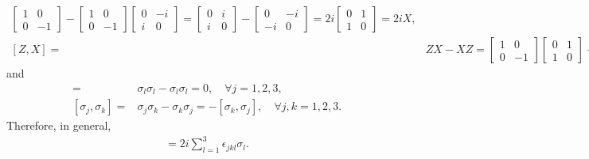 \documentclass[en]{sol-man}
\begin{document}
\begin{pf}
\begin{align}
\begin{bmatrix}
            1&0\\
            0&-1
        \end{bmatrix}-\begin{bmatrix}
            1&0\\
            0&-1
        \end{bmatrix}\begin{bmatrix}
            0&-i\\
            i&0
        \end{bmatrix}=\begin{bmatrix}
            0&i\\
            i&0
        \end{bmatrix}-\begin{bmatrix}
            0&-i\\
            -i&0
        \end{bmatrix}=2i\begin{bmatrix}
            0&1\\
            1&0
        \end{bmatrix}=2iX,\\
        [Z,X]=&ZX-XZ=\begin{bmatrix}
            1&0\\
            0&-1
        \end{bmatrix}\begin{bmatrix}
            0&1\\
            1&0
        \end{bmatrix}-\begin{bmatrix}
            0&1\\
            1&0
        \end{bmatrix}\begin{bmatrix}
            1&0\\
            0&-1
        \end{bmatrix}=\begin{bmatrix}
            0&1\\
            -1&0
        \end{bmatrix}-\begin{bmatrix}
            0&-1\\
            1&0
        \end{bmatrix}=2i\begin{bmatrix}
            0&-i\\
            i&0
        \end{bmatrix}=2iY,
    \end{align}
    and
    \begin{align}
        [\sigma_j,\sigma_j]=&\sigma_l\sigma_l-\sigma_l\sigma_l=0,\quad\forall j=1,2,3,\\
        [\sigma_j,\sigma_k]=&\sigma_j\sigma_k-\sigma_k\sigma_j=-[\sigma_k,\sigma_j],\quad\forall j,k=1,2,3.
    \end{align}
    Therefore, in general,
    \begin{align}
        [\sigma_j,\sigma_k]=2i\sum_{l=1}^3\epsilon_{jkl}\sigma_l.
    \end{align}
\end{pf}
\end{document}
